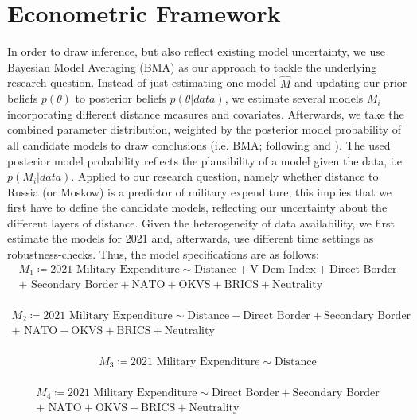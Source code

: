 \documentclass[12pt,a4paper]{article}
\begin{document}
\section{Econometric Framework}
In order to draw inference, but also reflect existing model uncertainty, we use Bayesian Model Averaging (BMA) as our approach to tackle the underlying research question.  Instead of just estimating one model $\hat{M}$ and updating our prior beliefs $p(\theta)$ to posterior beliefs $p(\theta \vert data)$, we estimate several models $M_{i}$ incorporating different distance measures and covariates. Afterwards, we take the combined parameter distribution, weighted by the posterior model probability of all candidate models to draw conclusions (i.e. BMA; following \citealp{jeffreys1939} and \citealp{jevons1874}). The used posterior model probability reflects the plausibility of a model given the data, i.e. $p(M_{i} \vert data)$.
\clearpage 
Applied to our research question, namely whether distance to Russia (or Moskow) is a predictor of military expenditure, this implies that we first have to define the candidate models, reflecting our uncertainty about the different layers of distance. Given the heterogeneity of data availability, we first estimate the models for 2021 and, afterwards, use different time settings as robustness-checks. Thus, the model specifications are as follows: 
\begin{align*}
 M_1 \coloneqq \textrm{2021 Military Expenditure} \sim \textrm{Distance} + \textrm{V-Dem Index} + \textrm{Direct Border} \\ +  \textrm{ Secondary Border} +  \textrm{NATO} + \textrm{OKVS} + \textrm{BRICS} + \textrm{Neutrality} 
\end{align*}\\[-3.5em]
\begin{align*}
 M_2 \coloneqq \textrm{2021 Military Expenditure} \sim \textrm{Distance} + \textrm{Direct Border} + \textrm{Secondary Border} \\ + \textrm{ NATO} + \textrm{OKVS} + \textrm{BRICS} + \textrm{Neutrality} 
\end{align*}\\[-3.5em]
\begin{align*}
M_3 \coloneqq \textrm{2021 Military Expenditure} \sim \textrm{Distance}  
\end{align*}\\[-3.5em]
\begin{align*}
  M_4 \coloneqq \textrm{2021 Military Expenditure} \sim \textrm{Direct Border} + \textrm{Secondary Border} \\ + \textrm{ NATO} + \textrm{OKVS} + \textrm{BRICS} + \textrm{Neutrality} 
\end{align*}
\end{document}
